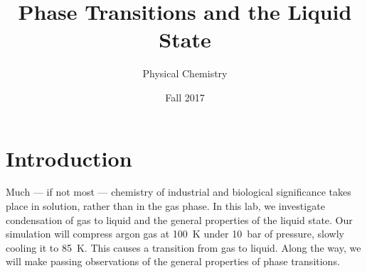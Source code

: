 \documentclass{article}
\title{Phase Transitions and the Liquid State}
\author{Physical Chemistry}
\date{Fall 2017}
\begin{document}
\maketitle
\tableofcontents

\section{Introduction}
Much — if not most — chemistry of industrial and biological significance takes place in solution, rather than in the gas phase.
In this lab, we investigate condensation of gas to liquid and the general properties of the liquid state.
Our simulation will compress argon gas at 100~K under 10~bar of pressure, slowly cooling it to 85~K.
This causes a transition from gas to liquid.
Along the way, we will make passing observations of the general properties of phase transitions.
\end{document}
